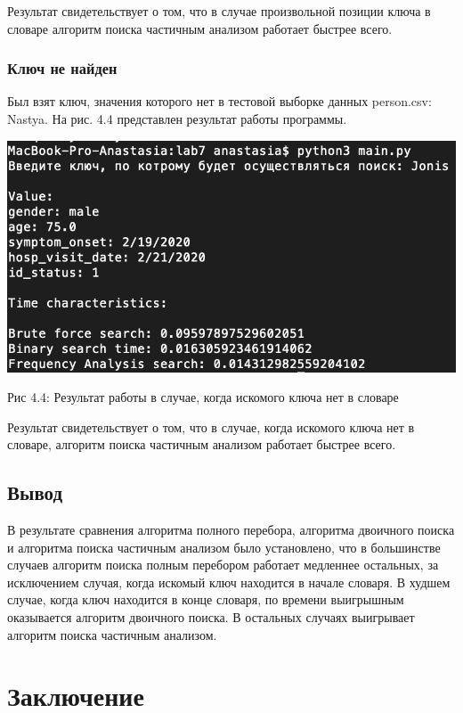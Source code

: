 \documentclass[12pt]{report}
\begin{document}
Результат свидетельствует о том, что в случае произвольной позиции ключа в словаре алгоритм поиска частичным анализом работает быстрее всего.

\subsection{Ключ не найден}

Был взят ключ, значения которого нет в тестовой выборке данных person.csv: Nastya. На рис. 4.4 представлен результат работы программы.

\begin{center}
		\includegraphics[scale=0.7]{pics/Random}
		
			Рис 4.4: Результат работы в случае, когда искомого ключа нет в словаре
\end{center}

Результат свидетельствует о том, что в случае, когда искомого ключа нет в словаре, алгоритм поиска частичным анализом работает быстрее всего.


\section{Вывод}

В результате сравнения алгоритма полного перебора, алгоритма двоичного поиска и алгоритма поиска частичным анализом было установлено, что в большинстве случаев алгоритм поиска полным перебором работает медленнее остальных, за исключением случая, когда искомый ключ находится в начале словаря. В худшем случае, когда ключ находится в конце словаря, по времени выигрышным оказывается алгоритм двоичного поиска. В остальных случаях выигрывает алгоритм поиска частичным анализом.

\chapter*{Заключение}
\end{document}
